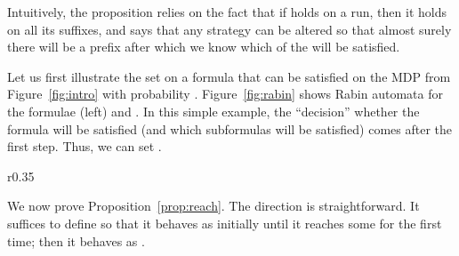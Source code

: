 \documentclass[a4paper,UKenglish]{lipics}
\begin{document}
\noindent
Intuitively, the proposition relies on the fact that if  holds on a run, then it holds on all its suffixes, and says that any strategy  can be altered so that almost surely there will be a prefix after which we know which of the  will be satisfied.

\begin{example}\label{ex:upsilon-intuition}
	Let us first illustrate the set  on a formula  that can be satisfied on the MDP from Figure~\ref{fig:intro} with probability . Figure~\ref{fig:rabin} shows Rabin automata for the formulae
	 (left) and . 
In this simple example, the ``decision'' whether the formula will be satisfied (and which  subformulas will be satisfied) comes after the first step. Thus, we can set .
\end{example}

\begin{wrapfigure}[10]{r}{0.35\textwidth}
	\caption{Example Rabin aut.\label{fig:rabin}}
\end{wrapfigure}

We now prove Proposition~\ref{prop:reach}. The direction  is straightforward. It suffices to define  so that it behaves as  initially until it reaches some  for the first time; then it behaves as .
\end{document}
